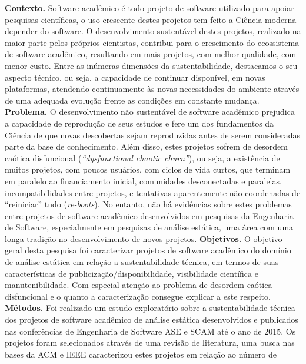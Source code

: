 \textbf{Contexto.} 
Software acadêmico é todo projeto de software utilizado para apoiar pesquisas
científicas, o uso crescente destes projetos tem feito a Ciência moderna
depender do software. O desenvolvimento sustentável destes projetos,
realizado na maior parte pelos próprios cientistas, contribui para o
crescimento do ecossistema de software acadêmico, resultando em mais projetos, com melhor
qualidade, com menor custo.
%
Entre as inúmeras dimensões da sustentabilidade, destacamos o seu aspecto
técnico, ou seja, a capacidade de continuar disponível, em novas plataformas,
atendendo continuamente às novas necessidades do ambiente através de uma
adequada evolução frente as condições em constante mudança.
\textbf{Problema.} 
O desenvolvimento não sustentável de software acadêmico prejudica a capacidade
de reprodução de seus estudos e fere um dos fundamentos da Ciência de que novas
descobertas sejam reproduzidas antes de serem consideradas parte da base de
conhecimento.
Além disso, estes projetos sofrem de desordem caótica disfuncional ({\it ``dysfunctional
chaotic churn''}), ou seja, a existência de muitos projetos, com poucos
usuários, com ciclos de vida curtos, que terminam em paralelo ao financiamento
inicial, comunidades desconectadas e paralelas, incompatibilidades entre
projetos, e tentativas aparentemente não coordenadas de ``reiniciar'' tudo
({\it re-boots}).
No entanto, não há evidências sobre estes problemas entre projetos de software
acadêmico desenvolvidos em pesquisas da Engenharia de Software, especialmente
em pesquisas de análise estática, uma área com uma longa tradição no
desenvolvimento de novos projetos.
\textbf{Objetivos.}
O objetivo geral desta pesquisa foi caracterizar projetos de software acadêmico
do domínio de análise estática em relação a sustentabilidade técnica, em termos
de suas características de publicização/disponibilidade, visibilidade
científica e manutenibilidade.
Com especial atenção ao problema de desordem caótica disfuncional
e o quanto a caracterização consegue explicar a este respeito.
\textbf{Métodos.}
Foi realizado um estudo exploratório sobre a sustentabilidade
técnica dos projetos de software acadêmico de análise estática desenvolvidos e
publicados nas conferências de Engenharia de Software ASE e SCAM até o ano de
2015.
%
Os projetos foram selecionados através de uma revisão de literatura, uma busca
nas bases da ACM e IEEE caracterizou estes projetos em relação ao número de
